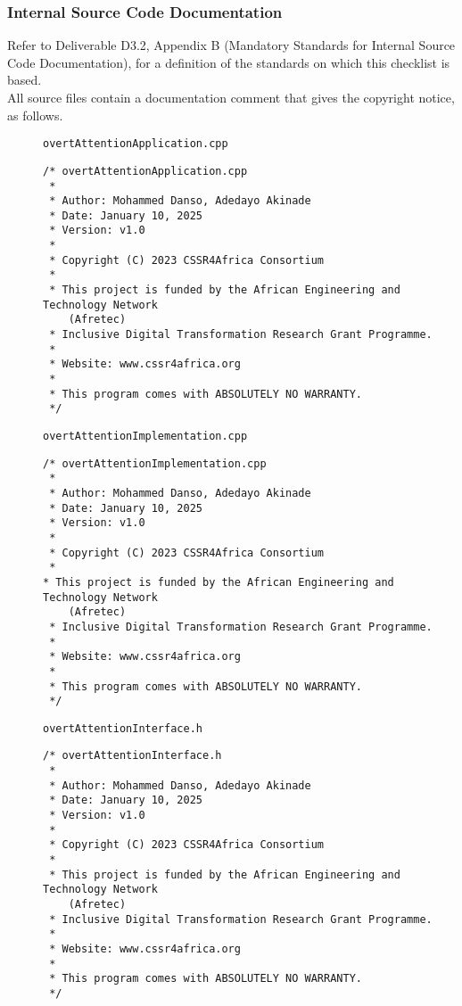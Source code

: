 \documentclass{CSSRforAfrica}
\newcommand{\blank}{~\\}
\newcommand{\checkboxChecked}{\fbox{\ding{51}}} %
\begin{document}
 
 
\subsubsection{Internal Source Code Documentation}
\label{subsubsection:overt_attention_documentation_standards}  
 
Refer to Deliverable D3.2, Appendix B (Mandatory Standards for Internal Source Code Documentation), for a definition of the standards on which this checklist is based.\\

\noindent All source files contain a documentation comment that gives the copyright notice, as follows.
 
\begin{description}

\item[\checkboxChecked] {\small \verb+overtAttentionApplication.cpp+}  
{\small \begin{verbatim}
/* overtAttentionApplication.cpp
 *
 * Author: Mohammed Danso, Adedayo Akinade
 * Date: January 10, 2025
 * Version: v1.0
 * 
 * Copyright (C) 2023 CSSR4Africa Consortium
 * 
 * This project is funded by the African Engineering and Technology Network 
    (Afretec) 
 * Inclusive Digital Transformation Research Grant Programme. 
 *
 * Website: www.cssr4africa.org
 *
 * This program comes with ABSOLUTELY NO WARRANTY.
 */
\end{verbatim} }

\item[\checkboxChecked]  {\small \verb+overtAttentionImplementation.cpp+}  
{\small \begin{verbatim}
/* overtAttentionImplementation.cpp
 *
 * Author: Mohammed Danso, Adedayo Akinade
 * Date: January 10, 2025
 * Version: v1.0
 * 
 * Copyright (C) 2023 CSSR4Africa Consortium
 * 
* This project is funded by the African Engineering and Technology Network 
    (Afretec) 
 * Inclusive Digital Transformation Research Grant Programme. 
 *
 * Website: www.cssr4africa.org
 *
 * This program comes with ABSOLUTELY NO WARRANTY.
 */
\end{verbatim} }

\newpage
\item[\checkboxChecked] {\small \verb+overtAttentionInterface.h+}   
{\small \begin{verbatim}
/* overtAttentionInterface.h
 *
 * Author: Mohammed Danso, Adedayo Akinade
 * Date: January 10, 2025
 * Version: v1.0
 * 
 * Copyright (C) 2023 CSSR4Africa Consortium
 * 
 * This project is funded by the African Engineering and Technology Network 
    (Afretec) 
 * Inclusive Digital Transformation Research Grant Programme. 
 *
 * Website: www.cssr4africa.org
 *
 * This program comes with ABSOLUTELY NO WARRANTY.
 */
\end{verbatim} }


\end{description} 
%
\end{document}
